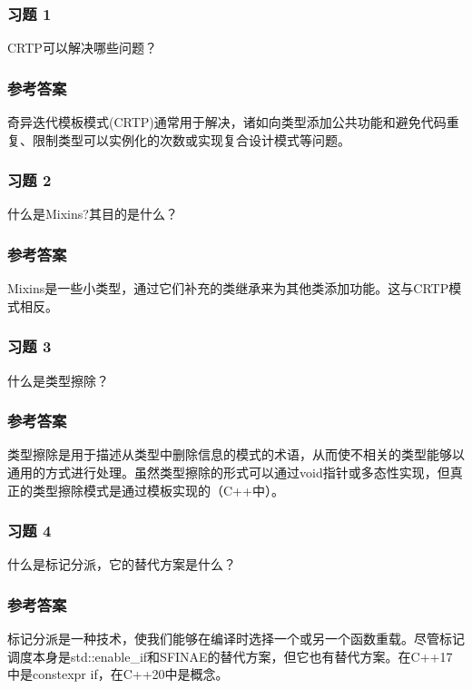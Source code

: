 \subsubsection{习题 1}

CRTP可以解决哪些问题？

\subsubsection{参考答案}

奇异迭代模板模式(CRTP)通常用于解决，诸如向类型添加公共功能和避免代码重复、限制类型可以实例化的次数或实现复合设计模式等问题。


\subsubsection{习题 2}

什么是Mixins?其目的是什么？

\subsubsection{参考答案}

Mixins是一些小类型，通过它们补充的类继承来为其他类添加功能。这与CRTP模式相反。

\subsubsection{习题 3}

什么是类型擦除？

\subsubsection{参考答案}

类型擦除是用于描述从类型中删除信息的模式的术语，从而使不相关的类型能够以通用的方式进行处理。虽然类型擦除的形式可以通过void指针或多态性实现，但真正的类型擦除模式是通过模板实现的（C++中）。

\subsubsection{习题 4}

什么是标记分派，它的替代方案是什么？

\subsubsection{参考答案}

标记分派是一种技术，使我们能够在编译时选择一个或另一个函数重载。尽管标记调度本身是std::enable\_if和SFINAE的替代方案，但它也有替代方案。在C++17中是constexpr if，在C++20中是概念。

